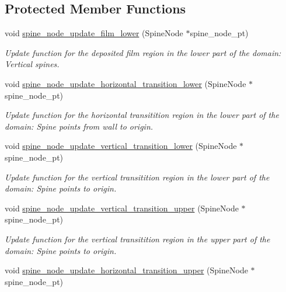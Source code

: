 \subsection*{Protected Member Functions}
\begin{DoxyCompactItemize}
\item 
void \hyperlink{classoomph_1_1BrethertonSpineMesh_a0446cb0efaa31739f51ae0534a73d116}{spine\+\_\+node\+\_\+update\+\_\+film\+\_\+lower} (Spine\+Node $\ast$spine\+\_\+node\+\_\+pt)
\begin{DoxyCompactList}\small\item\em Update function for the deposited film region in the lower part of the domain\+: Vertical spines. \end{DoxyCompactList}\item 
void \hyperlink{classoomph_1_1BrethertonSpineMesh_a0dc35290fc96a075d864e79528e5fec8}{spine\+\_\+node\+\_\+update\+\_\+horizontal\+\_\+transition\+\_\+lower} (Spine\+Node $\ast$spine\+\_\+node\+\_\+pt)
\begin{DoxyCompactList}\small\item\em Update function for the horizontal transitition region in the lower part of the domain\+: Spine points from wall to origin. \end{DoxyCompactList}\item 
void \hyperlink{classoomph_1_1BrethertonSpineMesh_a9ec578183760e386ed5229ba193e1fdf}{spine\+\_\+node\+\_\+update\+\_\+vertical\+\_\+transition\+\_\+lower} (Spine\+Node $\ast$spine\+\_\+node\+\_\+pt)
\begin{DoxyCompactList}\small\item\em Update function for the vertical transitition region in the lower part of the domain\+: Spine points to origin. \end{DoxyCompactList}\item 
void \hyperlink{classoomph_1_1BrethertonSpineMesh_a6ddc62166abfd621219551957c9b1103}{spine\+\_\+node\+\_\+update\+\_\+vertical\+\_\+transition\+\_\+upper} (Spine\+Node $\ast$spine\+\_\+node\+\_\+pt)
\begin{DoxyCompactList}\small\item\em Update function for the vertical transitition region in the upper part of the domain\+: Spine points to origin. \end{DoxyCompactList}\item 
void \hyperlink{classoomph_1_1BrethertonSpineMesh_aa9fa4941d8fb02a388e933a7dd1c76a2}{spine\+\_\+node\+\_\+update\+\_\+horizontal\+\_\+transition\+\_\+upper} (Spine\+Node $\ast$spine\+\_\+node\+\_\+pt)

\end{DoxyCompactItemize}
